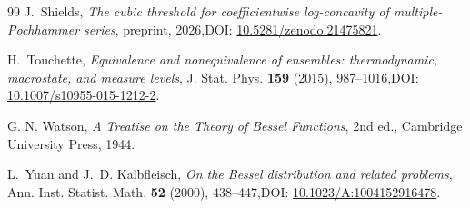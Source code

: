 \documentclass[11pt,a4paper]{amsart}
\numberwithin{equation}{section}
\theoremstyle{plain}
\theoremstyle{definition}
\begin{document}
\begin{thebibliography}{99}
J.~Shields,
\emph{The cubic threshold for coefficientwise log-concavity of
multiple-Pochhammer series},
preprint, 2026,\newline DOI:
\href{https://doi.org/10.5281/zenodo.21475821}{10.5281/zenodo.21475821}.

H.~Touchette,
\emph{Equivalence and nonequivalence of ensembles: thermodynamic, macrostate, and measure levels},
J. Stat. Phys. \textbf{159} (2015), 987--1016,\newline DOI: \href{https://doi.org/10.1007/s10955-015-1212-2}{10.1007/s10955-015-1212-2}.

G. N. Watson,
\emph{A Treatise on the Theory of Bessel Functions}, 2nd ed.,
Cambridge University Press, 1944.


L.~Yuan and J.~D. Kalbfleisch,
\emph{On the Bessel distribution and related problems},
Ann. Inst. Statist. Math. \textbf{52} (2000), 438--447,\newline DOI: \href{https://doi.org/10.1023/A:1004152916478}{10.1023/A:1004152916478}.

\end{thebibliography}
\end{document}

